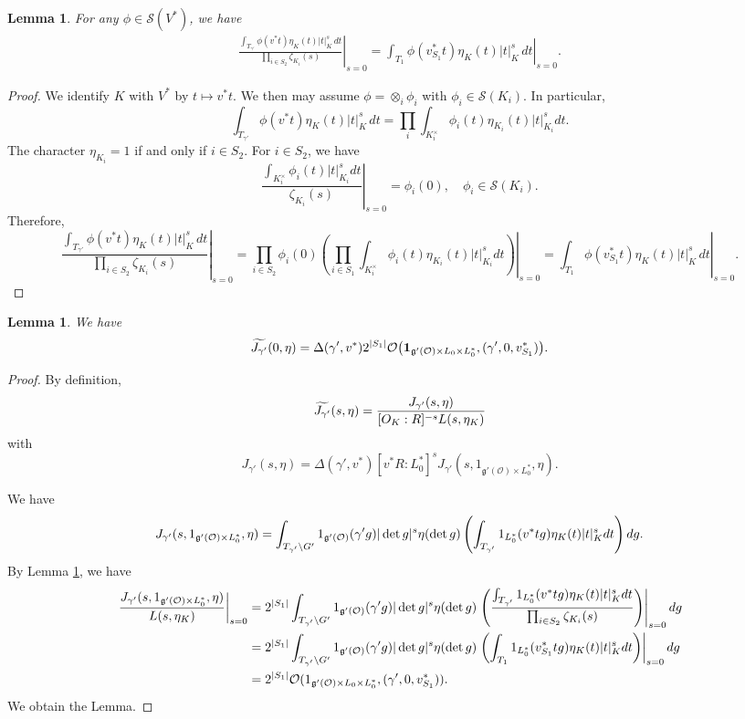 \documentclass[a4paper]{amsart}
\newcommand{\CO}{{\mathcal {O}}} \newcommand{\CP}{{\mathcal {P}}}
\newcommand{\CS}{{\mathcal {S}}} \newcommand{\CT}{{\mathcal {T}}}
\newcommand{\fg}{{\mathfrak{g}}} \newcommand{\fh}{{\mathfrak{h}}}
\theoremstyle{plain}
\newtheorem{lem}[thm]{Lemma}  \newtheorem{prop}[thm]{Proposition}
\theoremstyle{remark} \newtheorem{remark}[thm]{Remark}
\theoremstyle{exercise} \newtheorem{exercise}[thm]{Exercise}
\theoremstyle{example} \newtheorem{example}[thm]{Example}
\theoremstyle{question} \newtheorem{question}[thm]{Question}
\theoremstyle{assumption} \newtheorem{assumption}[thm]{Assumption}
\numberwithin{equation}{section}
\begin{document}
\begin{lem}\label{lem-3}
For any \(\phi\in\CS(V^*)\), we have
\begin{align}\label{equ-lem-3}
\left. 
\frac{\int_{T_{\gamma'}}\phi(v^*t)\eta_K(t)|t|_K^s\,dt}{\prod_{i\in S_2} \zeta_{K_i}(s)}
\right|_{s=0}
=
\left.
\int_{T_1}\phi(v^*_{S_1}t)\eta_K(t)
|t|_K^s\,dt
\right|_{s=0}.
\end{align}
\end{lem}
\begin{proof}
   We identify $K$ with $V^*$ by $t \mapsto v^* t$. We then may
   assume $\phi = \otimes_i \phi_i$ with $\phi_i \in \CS(K_i)$. 
   In particular,
   \[\int_{T_{\gamma'}}\phi(v^*t)\eta_K(t)|t|_K^s\,dt = 
   \prod_i \int_{K_i^\times} \phi_i(t)\eta_{K_i}(t)|t|_{K_i}^s dt.\]
   The character $\eta_{K_i} = 1$ if and only if $i \in S_2$. 
   For $i \in S_2$, we have
   \[\left. \frac{\int_{K_i^\times} \phi_i(t)|t|_{K_i}^s dt}
   {\zeta_{K_i}(s)} \right|_{s=0} = \phi_i(0), \quad \phi_i \in \CS(K_i).\]
   Therefore,
   \[\left. 
\frac{\int_{T_{\gamma'}}\phi(v^*t)\eta_K(t)|t|_K^s\,dt}{\prod_{i\in S_2} \zeta_{K_i}(s)}
\right|_{s=0}
= \prod_{i \in S_2} \phi_i(0) \left. \left(\prod_{i \in S_1} 
\int_{K_i^\times} \phi_i(t)\eta_{K_i}(t)|t|_{K_i}^s dt\right)\right|_{s=0} = \left.
\int_{T_1}\phi(v^*_{S_1}t)\eta_K(t)
|t|_K^s\,dt
\right|_{s=0}.\]

\end{proof}

\begin{lem}\label{lem-4}
    We have
    \[\wt{J_{\gamma'}}(0,\eta)=\Delta(\gamma',v^*)2^{|S_1|}\CO\big(\mathbf{1}_{\fg'(\CO)\times L_0\times L_0^*},(\gamma',0,v^*_{S_1})\big).\]
\end{lem}
\begin{proof}
   By definition,
   \[\widetilde{J_{\gamma'}}(s,\eta) = \frac{J_{\gamma'}(s,\eta)}{
   [O_K: R]^{-s}L(s,\eta_K)}\]
   with
   \[J_{\gamma'}(s,\eta) = \Delta(\gamma',v^*)[v^*R:L_0^*]^s
   J_{\gamma'}(s,1_{\fg'(\CO) \times L_0^*},\eta).\]

   We have
   \[J_{\gamma'}(s,1_{\fg'(\CO) \times L_0^*},\eta)
   = \int_{T_{\gamma'} \bs G'} 1_{\fg'(\CO)}(\gamma' g)|\det g|^s
   \eta(\det g) \left(\int_{T_{\gamma'}} 1_{L_0^*}(v^* tg)\eta_K(t)|t|_K^sdt\right) dg.\]
   By Lemma \ref{lem-3}, we have
   \[
   \begin{aligned}
   \left. \frac{J_{\gamma'}(s,1_{\fg'(\CO) \times L_0^*},\eta)}
   {L(s,\eta_K)} \right|_{s=0} &= 2^{|S_1|} 
   \int_{T_{\gamma'} \bs G'} 1_{\fg'(\CO)}(\gamma' g)|\det g|^s
   \eta(\det g) \left.\left(\frac{\int_{T_{\gamma'}} 1_{L_0^*}(v^* tg)\eta_K(t)|t|_K^sdt}{\prod_{i \in S_2} \zeta_{K_i}(s)}\right)
   \right|_{s=0}dg \\
   &=2^{|S_1|} 
   \int_{T_{\gamma'} \bs G'} 1_{\fg'(\CO)}(\gamma' g)|\det g|^s
   \eta(\det g) \left.\left( \int_{T_1} 1_{L_0^*}(v^*_{S_1}tg)
   \eta_K(t)|t|_K^s dt\right)
   \right|_{s=0}dg \\
   &= 2^{|S_1|} \CO(1_{\fg'(\CO) \times L_0 \times L_0^*},(\gamma',0,v_{S_1}^*)).
   \end{aligned}
   \]
   We obtain the Lemma.
\end{proof}
 
\end{document}
